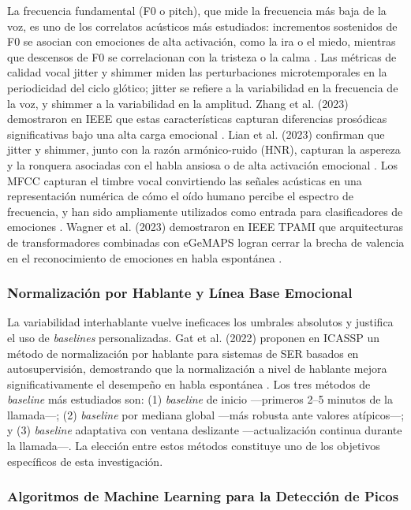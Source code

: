 La frecuencia fundamental (F0 o pitch), que mide la frecuencia más baja de la voz,
es uno de los correlatos acústicos más estudiados: incrementos sostenidos de F0 se
asocian con emociones de alta activación, como la ira o el miedo, mientras que
descensos de F0 se correlacionan con la tristeza o la calma \cite{jha2022, lian2023}.
Las métricas de calidad vocal jitter y shimmer miden las perturbaciones
microtemporales en la periodicidad del ciclo glótico; jitter se refiere a la
variabilidad en la frecuencia de la voz, y shimmer a la variabilidad en la amplitud.
Zhang et al. (2023) demostraron en IEEE que estas características capturan diferencias
prosódicas significativas bajo una alta carga emocional \cite{zhang2023}. Lian et al.
(2023) confirman que jitter y shimmer, junto con la razón armónico-ruido (HNR),
capturan la aspereza y la ronquera asociadas con el habla ansiosa o de alta activación
emocional \cite{lian2023}. Los MFCC capturan el timbre vocal convirtiendo las señales
acústicas en una representación numérica de cómo el oído humano percibe el espectro
de frecuencia, y han sido ampliamente utilizados como entrada para clasificadores de
emociones \cite{jha2022, abdelhamid2022}. Wagner et al. (2023) demostraron en IEEE
TPAMI que arquitecturas de transformadores combinadas con eGeMAPS logran cerrar la
brecha de valencia en el reconocimiento de emociones en habla espontánea
\cite{wagner2023}.

\subsubsection{Normalización por Hablante y Línea Base Emocional}

La variabilidad interhablante vuelve ineficaces los umbrales absolutos y justifica el
uso de \textit{baselines} personalizadas. Gat et al. (2022) proponen en ICASSP un
método de normalización por hablante para sistemas de SER basados en
autosupervisión, demostrando que la normalización a nivel de hablante mejora
significativamente el desempeño en habla espontánea \cite{gat2022}. Los tres métodos
de \textit{baseline} más estudiados son: (1) \textit{baseline} de inicio —primeros
2--5 minutos de la llamada—; (2) \textit{baseline} por mediana global —más robusta
ante valores atípicos—; y (3) \textit{baseline} adaptativa con ventana deslizante
—actualización continua durante la llamada—. La elección entre estos métodos
constituye uno de los objetivos específicos de esta investigación.

\subsubsection{Algoritmos de Machine Learning para la Detección de Picos}

